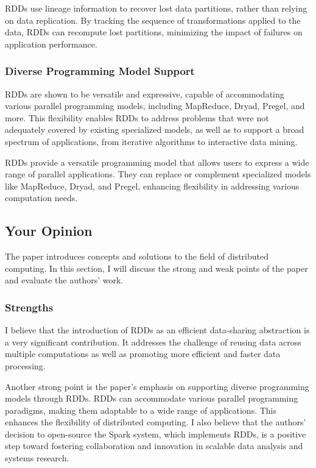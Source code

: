 \documentclass[10pt]{proc}
\begin{document}
RDDs use lineage information to recover lost data partitions, rather than relying on data replication. By tracking the sequence of transformations applied to the data, RDDs can recompute lost partitions, minimizing the impact of failures on application performance.
    
\subsubsection{Diverse Programming Model Support}
RDDs are shown to be versatile and expressive, capable of accommodating various parallel programming models, including MapReduce, Dryad, Pregel, and more. This flexibility enables RDDs to address problems that were not adequately covered by existing specialized models, as well as to support a broad spectrum of applications, from iterative algorithms to interactive data mining.

RDDs provide a versatile programming model that allows users to express a wide range of parallel applications. They can replace or complement specialized models like MapReduce, Dryad, and Pregel, enhancing flexibility in addressing various computation needs.

\subsection{Your Opinion}

The paper  introduces concepts and solutions to the field of distributed computing. In this section, I will discuss the strong and weak points of the paper and evaluate the authors' work.

\subsubsection{Strengths}
I believe that the introduction of RDDs as an efficient data-sharing abstraction is a very significant contribution. It addresses the challenge of reusing data across multiple computations as well as promoting more efficient and faster data processing.

Another strong point is the paper's emphasis on supporting diverse programming models through RDDs. RDDs can accommodate various parallel programming paradigms, making them adaptable to a wide range of applications. This enhances the flexibility of distributed computing. I also believe that the authors' decision to open-source the Spark system, which implements RDDs, is a positive step toward fostering collaboration and innovation in scalable data analysis and systems research.
\end{document}
